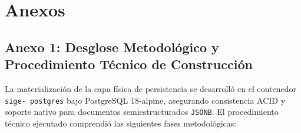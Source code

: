 \documentclass[12pt,a4paper]{article}
\begin{document}
\vspace{0.4cm}

\section{Anexos}

\subsection*{Anexo 1: Desglose Metodológico y Procedimiento Técnico de Construcción}
La materialización de la capa física de persistencia se desarrolló en el contenedor \texttt{sige- postgres} bajo PostgreSQL 18-alpine, asegurando consistencia ACID y soporte nativo para documentos semiestructurados \texttt{JSONB}. El procedimiento técnico ejecutado comprendió las siguientes fases metodológicas:
\end{document}

